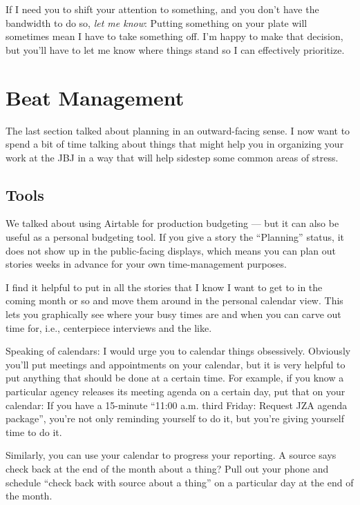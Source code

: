 \documentclass[
  12pt,
  american,
  letterpaperpaper,
  extrafontsizes,onecolumn,openright
  ]{memoir}
\begin{document}
If I need you to shift your attention to something, and you don't have the bandwidth to do so, \emph{let me know}: Putting something on your plate will sometimes mean I have to take something off. I'm happy to make that decision, but you'll have to let me know where things stand so I can effectively prioritize.

\hypertarget{beat-management}{%
\chapter{Beat Management}\label{beat-management}}

The last section talked about planning in an outward-facing sense. I now want to spend a bit of time talking about things that might help you in organizing your work at the JBJ in a way that will help sidestep some common areas of stress.

\hypertarget{tools}{%
\section*{Tools}\label{tools}}

We talked about using Airtable for production budgeting --- but it can also be useful as a personal budgeting tool. If you give a story the \enquote{Planning} status, it does not show up in the public-facing displays, which means you can plan out stories weeks in advance for your own time-management purposes.

I find it helpful to put in all the stories that I know I want to get to in the coming month or so and move them around in the personal calendar view. This lets you graphically see where your busy times are and when you can carve out time for, i.e., centerpiece interviews and the like.

Speaking of calendars: I would urge you to calendar things obsessively. Obviously you'll put meetings and appointments on your calendar, but it is very helpful to put anything that should be done at a certain time. For example, if you know a particular agency releases its meeting agenda on a certain day, put that on your calendar: If you have a 15-minute \enquote{11:00 a.m. third Friday: Request JZA agenda package}, you're not only reminding yourself to do it, but you're giving yourself time to do it.

Similarly, you can use your calendar to progress your reporting. A source says check back at the end of the month about a thing? Pull out your phone and schedule \enquote{check back with source about a thing} on a particular day at the end of the month.
\end{document}
